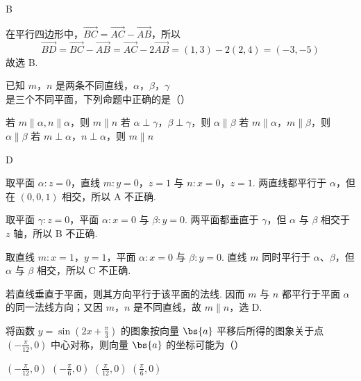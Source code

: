 \begin{answer}
B
\end{answer}

\begin{solution}
在平行四边形中，\(\overrightarrow{BC}=\overrightarrow{AC}-\overrightarrow{AB}\)，所以
\[
\overrightarrow{BD}=\overrightarrow{BC}-\overrightarrow{AB}
=\overrightarrow{AC}-2\overrightarrow{AB}
=(1,3)-2(2,4)=(-3,-5)
\]
故选 B.
\end{solution}

\begin{problem}
已知 \(m\)，\(n\) 是两条不同直线，\(\alpha\)，\(\beta\)，\(\gamma\) 是三个不同平面，下列命题中正确的是（\quad）

\choices
    {若 \(m \parallel \alpha, n \parallel \alpha\)，则 \(m \parallel n\)}
    {若 \(\alpha \perp \gamma\)，\(\beta \perp \gamma\)，则 \(\alpha \parallel \beta\)}
    {若 \(m \parallel \alpha\)，\(m \parallel \beta\)，则 \(\alpha \parallel \beta\)}
    {若 \(m \perp \alpha\)，\(n \perp \alpha\)，则 \(m \parallel n\)}
\end{problem}

\begin{answer}
D
\end{answer}

\begin{solution}
取平面 \(\alpha:z=0\)，直线 \(m:y=0\)，\(z=1\) 与 \(n:x=0\)，\(z=1\). 两直线都平行于 \(\alpha\)，但在 \((0,0,1)\) 相交，所以 A 不正确.

取平面 \(\gamma:z=0\)，平面 \(\alpha:x=0\) 与 \(\beta:y=0\). 两平面都垂直于 \(\gamma\)，但 \(\alpha\) 与 \(\beta\) 相交于 \(z\) 轴，所以 B 不正确.

取直线 \(m:x=1\)，\(y=1\)，平面 \(\alpha:x=0\) 与 \(\beta:y=0\). 直线 \(m\) 同时平行于 \(\alpha\)、\(\beta\)，但 \(\alpha\) 与 \(\beta\) 相交，所以 C 不正确.

若直线垂直于平面，则其方向平行于该平面的法线. 因而 \(m\) 与 \(n\) 都平行于平面 \(\alpha\) 的同一法线方向；又因 \(m\)，\(n\) 是不同直线，故 \(m\parallel n\)，选 D.
\end{solution}

\begin{problem}
将函数 \( y = \sin \left(2x + \frac{\pi}{3}\right) \) 的图象按向量 \( \bs{a} \) 平移后所得的图象关于点 \( \left(-\frac{\pi}{12}, 0\right) \) 中心对称，则向量 \( \bs{a} \) 的坐标可能为（\quad）

\choices
    {\( \left(-\frac{\pi}{12},0\right) \)}
    {\( \left(-\frac{\pi}{6},0\right) \)}
    {\(\left(\frac{\pi}{12},0\right)\)}
    {\(\left(\frac{\pi}{6},0\right)\)}
\end{problem}

